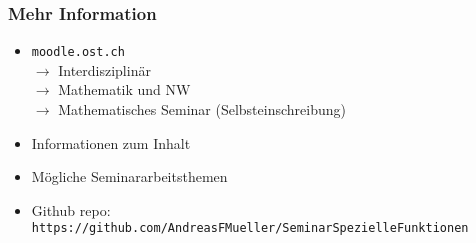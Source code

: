 %
%
%
\bgroup
\begin{frame}[t]
\setlength{\abovedisplayskip}{5pt}
\setlength{\belowdisplayskip}{5pt}
\frametitle{Mehr Information}
\begin{itemize}
\item \texttt{moodle.ost.ch}\\
$\rightarrow$ Interdisziplinär\\
$\rightarrow$ Mathematik und NW\\
$\rightarrow$ Mathematisches Seminar
(Selbsteinschreibung)
\item<2-> Informationen zum Inhalt
\item<3-> Mögliche Seminararbeitsthemen
\item<4-> Github repo: \texttt{https://github.com/AndreasFMueller/SeminarSpezielleFunktionen}
\end{itemize}
\end{frame}
\egroup
